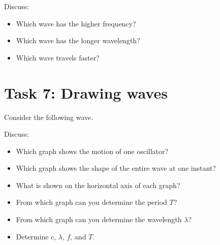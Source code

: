\documentclass[a4paper,12pt]{article}
\begin{document}
Discuss:

\begin{itemize}
    \item Which wave has the higher frequency?
    \item Which wave has the longer wavelength?
    \item Which wave travels faster?
\end{itemize}


\newpage


\section*{Task 7: Drawing waves}

Consider the following wave.

\begin{center}
\end{center}

Discuss:

\begin{itemize}
    \item Which graph shows the motion of one oscillator?
    \item Which graph shows the shape of the entire wave at one instant?
    \item What is shown on the horizontal axis of each graph?
    \item From which graph can you determine the period $T$?
    \item From which graph can you determine the wavelength $\lambda$?
    \item Determine $c$, $\lambda$, $f$, and $T$.
\end{itemize}
\end{document}
